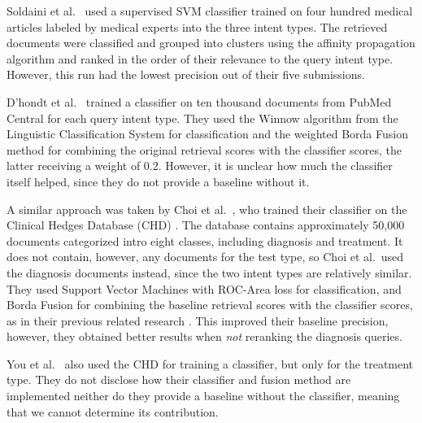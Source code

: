 Soldaini et al.\ \cite{soldani} used a supervised SVM classifier trained on four hundred medical articles
labeled by medical experts into the three intent types. The retrieved documents were classified
and grouped into clusters using the affinity propagation algorithm and ranked in the order of their relevance
to the query intent type. However, this run had the lowest precision out of their five submissions.

D’hondt et al.\ \cite{limsi2015} trained a classifier on ten thousand documents from PubMed Central
for each query intent type. They used the Winnow algorithm from the Linguistic Classification System
for classification and the weighted Borda Fusion method for combining the original retrieval scores
with the classifier scores, the latter receiving a weight of 0.2. However, it is
unclear how much the classifier itself helped, since they do not provide a baseline without it.

A similar approach was taken by Choi et al.\ \cite{choi},
who trained their classifier on the Clinical Hedges Database (CHD) \cite{chd}.
The database contains approximately 50,000 documents categorized
intro eight classes, including diagnosis and treatment.
It does not contain, however, any documents for the test type, so Choi et al.\ used the diagnosis documents instead,
since the two intent types are relatively similar.
They used Support Vector Machines with ROC-Area loss for classification,
and Borda Fusion for combining the baseline retrieval
scores with the classifier scores, as in their previous related research \cite{choi-prev}.
This improved their baseline precision, however, they obtained better results when \emph{not} reranking the diagnosis queries.

You et al.\ \cite{FDUMedSearch} also used the CHD for training a classifier, but only for the treatment type.
They do not disclose how their classifier and fusion method are implemented
neither do they provide a baseline without the classifier, meaning that we cannot determine its contribution.

